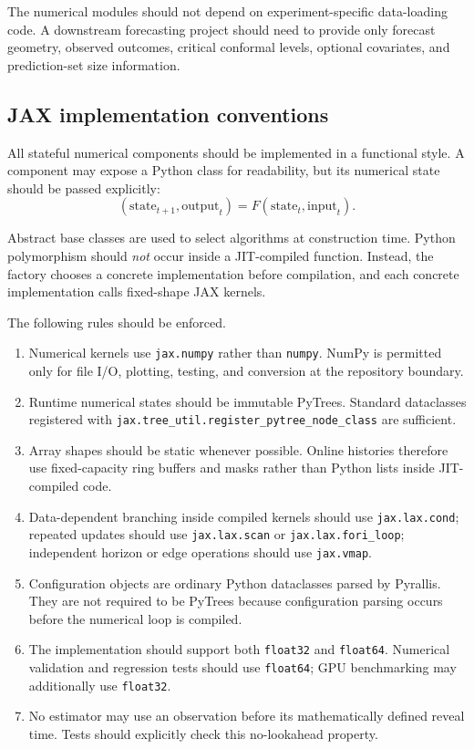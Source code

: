 \documentclass[11pt]{article}
\begin{document}
The numerical modules should not depend on experiment-specific data-loading
code.  A downstream forecasting project should need to provide only forecast
geometry, observed outcomes, critical conformal levels, optional covariates,
and prediction-set size information.

\subsection{JAX implementation conventions}

All stateful numerical components should be implemented in a functional style.
A component may expose a Python class for readability, but its numerical
state should be passed explicitly:
\[
    (\text{state}_{t+1},\text{output}_t)
    =
    F(\text{state}_t,\text{input}_t).
\]

Abstract base classes are used to select algorithms at construction time.
Python polymorphism should \emph{not} occur inside a JIT-compiled function.
Instead, the factory chooses a concrete implementation before compilation,
and each concrete implementation calls fixed-shape JAX kernels.

The following rules should be enforced.

\begin{enumerate}[leftmargin=*]
    \item Numerical kernels use \texttt{jax.numpy} rather than
    \texttt{numpy}.  NumPy is permitted only for file I/O, plotting, testing,
    and conversion at the repository boundary.

    \item Runtime numerical states should be immutable PyTrees.  Standard
    dataclasses registered with
    \texttt{jax.tree\_util.register\_pytree\_node\_class} are sufficient.

    \item Array shapes should be static whenever possible.  Online histories
    therefore use fixed-capacity ring buffers and masks rather than Python
    lists inside JIT-compiled code.

    \item Data-dependent branching inside compiled kernels should use
    \texttt{jax.lax.cond}; repeated updates should use
    \texttt{jax.lax.scan} or \texttt{jax.lax.fori\_loop}; independent
    horizon or edge operations should use \texttt{jax.vmap}.

    \item Configuration objects are ordinary Python dataclasses parsed by
    Pyrallis.  They are not required to be PyTrees because configuration
    parsing occurs before the numerical loop is compiled.

    \item The implementation should support both \texttt{float32} and
    \texttt{float64}.  Numerical validation and regression tests should use
    \texttt{float64}; GPU benchmarking may additionally use
    \texttt{float32}.

    \item No estimator may use an observation before its mathematically
    defined reveal time.  Tests should explicitly check this no-lookahead
    property.
\end{enumerate}
\end{document}

